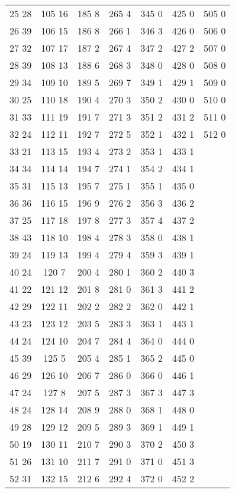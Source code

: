 \begin{table}
\begin{tabular}{c | c | c | c | c | c | c}
 25 28 & 105 16 & 185 8 & 265 4 & 345 0 & 425 0   & 505 0\\
 26 39 & 106 15 & 186 8 & 266 1 & 346 3 & 426 0   & 506 0\\
 27 32 & 107 17 & 187 2 & 267 4 & 347 2 & 427 2   & 507 0\\
 28 39 & 108 13 & 188 6 & 268 3 & 348 0 & 428 0   & 508 0\\
 29 34 & 109 10 & 189 5 & 269 7 & 349 1 & 429 1   & 509 0\\
 30 25 & 110 18 & 190 4 & 270 3 & 350 2 & 430 0   & 510 0\\
 31 33 & 111 19 & 191 7 & 271 3 & 351 2 & 431 2   & 511 0\\
 32 24 & 112 11 & 192 7 & 272 5 & 352 1 & 432 1   & 512 0\\
 33 21 & 113 15 & 193 4 & 273 2 & 353 1 & 433 1   & \\
 34 34 & 114 14 & 194 7 & 274 1 & 354 2 & 434 1   & \\
 35 31 & 115 13 & 195 7 & 275 1 & 355 1 & 435 0  & \\
 36 36 & 116 15 & 196 9 & 276 2 & 356 3 & 436 2  & \\
 37 25 & 117 18 & 197 8 & 277 3 & 357 4 & 437 2  & \\
 38 43 & 118 10 & 198 4 & 278 3 & 358 0 & 438 1  & \\
 39 24 & 119 13 & 199 4 & 279 4 & 359 3 & 439 1  & \\
 40 24 & 120 7 & 200 4 & 280 1 & 360 2 & 440 3  & \\
 41 22 & 121 12 & 201 8 & 281 0 & 361 3 & 441 2  & \\
 42 29 & 122 11 & 202 2 & 282 2 & 362 0 & 442 1  & \\
 43 23 & 123 12 & 203 5 & 283 3 & 363 1 & 443 1  & \\
 44 24 & 124 10 & 204 7 & 284 4 & 364 0 & 444 0  & \\
 45 39 & 125 5 & 205 4 & 285 1 & 365 2 & 445 0  & \\
 46 29 & 126 10 & 206 7 & 286 0 & 366 0 & 446 1  & \\
 47 24 & 127 8 & 207 5 & 287 3 & 367 3 & 447 3  & \\
 48 24 & 128 14 & 208 9 & 288 0 & 368 1 & 448 0  & \\
 49 28 & 129 12 & 209 5 & 289 3 & 369 1 & 449 1  & \\
 50 19 & 130 11 & 210 7 & 290 3 & 370 2 & 450 3  & \\
 51 26 & 131 10 & 211 7 & 291 0 & 371 0 & 451 3  & \\
 52 31 & 132 15 & 212 6 & 292 4 & 372 0 & 452 2  & \\

\end{tabular}
\end{table}
